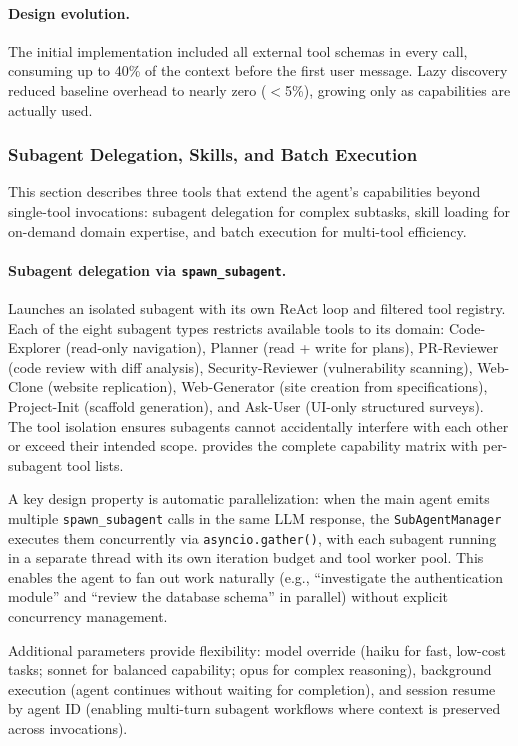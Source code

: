 \paragraph{Design evolution.} The initial implementation included all external tool schemas in every call, consuming up to 40\% of the context before the first user message. Lazy discovery reduced baseline overhead to nearly zero ($<$5\%), growing only as capabilities are actually used.

\subsubsection{Subagent Delegation, Skills, and Batch Execution}
\label{sec:tools_advanced}

This section describes three tools that extend the agent's capabilities beyond single-tool invocations: subagent delegation for complex subtasks, skill loading for on-demand domain expertise, and batch execution for multi-tool efficiency.

\paragraph{Subagent delegation via \texttt{spawn\_subagent}.} Launches an isolated subagent with its own ReAct loop and filtered tool registry. Each of the eight subagent types restricts available tools to its domain: Code-Explorer (read-only navigation), Planner (read + write for plans), PR-Reviewer (code review with diff analysis), Security-Reviewer (vulnerability scanning), Web-Clone (website replication), Web-Generator (site creation from specifications), Project-Init (scaffold generation), and Ask-User (UI-only structured surveys). The tool isolation ensures subagents cannot accidentally interfere with each other or exceed their intended scope.  provides the complete capability matrix with per-subagent tool lists.

A key design property is automatic parallelization: when the main agent emits multiple \texttt{spawn\_subagent} calls in the same LLM response, the \texttt{SubAgentManager} executes them concurrently via \texttt{asyncio.gather()}, with each subagent running in a separate thread with its own iteration budget and tool worker pool. This enables the agent to fan out work naturally (e.g., ``investigate the authentication module'' and ``review the database schema'' in parallel) without explicit concurrency management.

Additional parameters provide flexibility: model override (haiku for fast, low-cost tasks; sonnet for balanced capability; opus for complex reasoning), background execution (agent continues without waiting for completion), and session resume by agent ID (enabling multi-turn subagent workflows where context is preserved across invocations).

